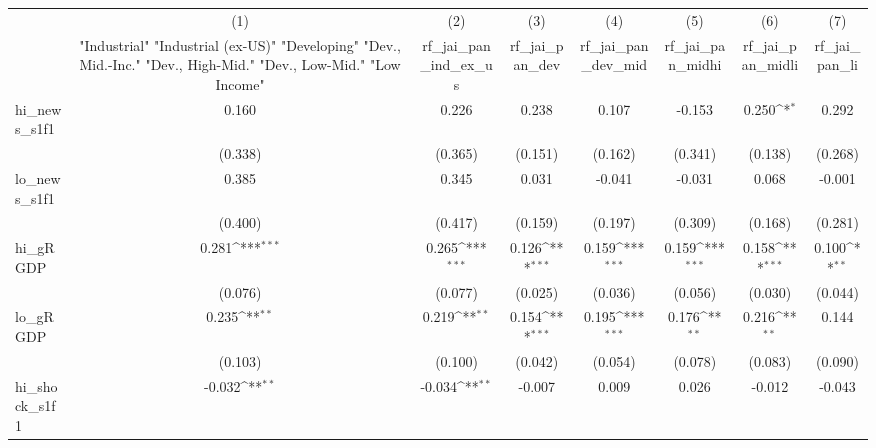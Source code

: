 {
\def\sym#1{\ifmmode^{#1}\else\(^{#1}\)\fi}
\begin{tabular}{l*{7}{c}}
\toprule
            &\multicolumn{1}{c}{(1)}&\multicolumn{1}{c}{(2)}&\multicolumn{1}{c}{(3)}&\multicolumn{1}{c}{(4)}&\multicolumn{1}{c}{(5)}&\multicolumn{1}{c}{(6)}&\multicolumn{1}{c}{(7)}\\
            &\multicolumn{1}{c}{ "Industrial" "Industrial (ex-US)" "Developing" "Dev., Mid.-Inc." "Dev., High-Mid."  "Dev., Low-Mid." "Low Income" }&\multicolumn{1}{c}{rf\_jai\_pan\_ind\_ex\_us}&\multicolumn{1}{c}{rf\_jai\_pan\_dev}&\multicolumn{1}{c}{rf\_jai\_pan\_dev\_mid}&\multicolumn{1}{c}{rf\_jai\_pan\_midhi}&\multicolumn{1}{c}{rf\_jai\_pan\_midli}&\multicolumn{1}{c}{rf\_jai\_pan\_li}\\
\midrule
hi\_news\_s1f1&       0.160         &       0.226         &       0.238         &       0.107         &      -0.153         &       0.250\sym{*}  &       0.292         \\
            &     (0.338)         &     (0.365)         &     (0.151)         &     (0.162)         &     (0.341)         &     (0.138)         &     (0.268)         \\
\addlinespace
lo\_news\_s1f1&       0.385         &       0.345         &       0.031         &      -0.041         &      -0.031         &       0.068         &      -0.001         \\
            &     (0.400)         &     (0.417)         &     (0.159)         &     (0.197)         &     (0.309)         &     (0.168)         &     (0.281)         \\
\addlinespace
hi\_gRGDP    &       0.281\sym{***}&       0.265\sym{***}&       0.126\sym{***}&       0.159\sym{***}&       0.159\sym{***}&       0.158\sym{***}&       0.100\sym{**} \\
            &     (0.076)         &     (0.077)         &     (0.025)         &     (0.036)         &     (0.056)         &     (0.030)         &     (0.044)         \\
\addlinespace
lo\_gRGDP    &       0.235\sym{**} &       0.219\sym{**} &       0.154\sym{***}&       0.195\sym{***}&       0.176\sym{**} &       0.216\sym{**} &       0.144         \\
            &     (0.103)         &     (0.100)         &     (0.042)         &     (0.054)         &     (0.078)         &     (0.083)         &     (0.090)         \\
\addlinespace
hi\_shock\_s1f1&      -0.032\sym{**} &      -0.034\sym{**} &      -0.007         &       0.009         &       0.026         &      -0.012         &      -0.043         \\

\end{tabular}}
